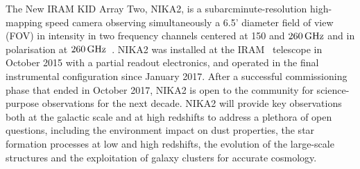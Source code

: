 %
%

The New IRAM KID Array Two, NIKA2, is a subarcminute-resolution
high-mapping speed camera observing simultaneously a 6.5' diameter
field of view (FOV) in intensity in two
frequency channels centered at 150 and $260\,\rm{GHz}$ and in
polarisation at $260\, \rm{GHz}$~\citep{Adam2018}. NIKA2 was installed
at the IRAM \trentemetre\ telescope in October 2015 with a partial readout
electronics, and operated in the final instrumental configuration since
January 2017. After a successful
commissioning phase that ended in October 2017, NIKA2 is
open to the community for science-purpose observations for the next
decade. NIKA2 will provide key observations both at the galactic scale
and at high redshifts to address a plethora of open questions, including
the environment impact on dust properties, the star formation processes
at low and high redshifts, the evolution of the large-scale structures
and the exploitation of galaxy clusters for accurate cosmology.
%
%

